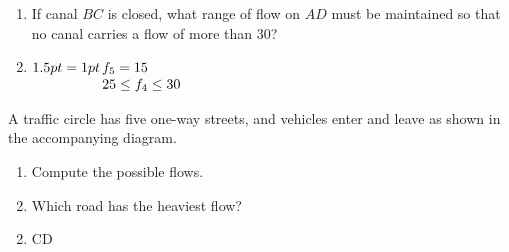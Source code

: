 \begin{multicols}{2}
\begin{ex}
\begin{enumerate}[label={\alph*.}]
\item If canal $BC$ is closed, what range of flow on $AD$ must be maintained so that no canal carries a flow of more than 30?

\end{enumerate}
\begin{sol}
\begin{enumerate}[label={\alph*.}]
\setcounter{enumi}{1}
\item  
$\arraycolsep=1pt
\begin{array}[t]{l}
	f_5 = 15 \\
	25 \leq f_4 \leq 30
\end{array}$

\end{enumerate}
\end{sol}
\end{ex}

\begin{ex}
A traffic circle has five one-way streets, and vehicles enter and leave as shown in the accompanying diagram.

\begin{figure}[H]
\centering

\end{figure}

\begin{enumerate}[label={\alph*.}]
\item Compute the possible flows.

\item Which road has the heaviest flow?

\end{enumerate}
\begin{sol}
\begin{enumerate}[label={\alph*.}]
\setcounter{enumi}{1}
\item CD
\end{enumerate}
\end{sol}
\end{ex}


\end{multicols}
